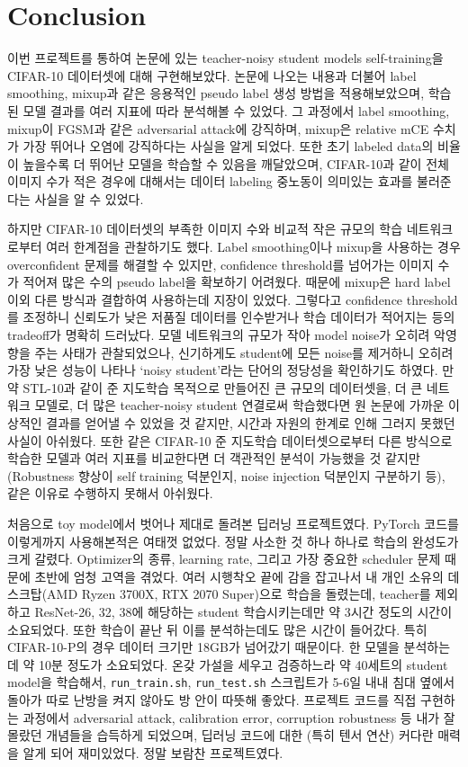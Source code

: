 \section{Conclusion}
이번 프로젝트를 통하여 \cite{xie2020selftraining} 논문에 있는 teacher-noisy student models self-training을 CIFAR-10 데이터셋에 대해 구현해보았다. 논문에 나오는 내용과 더불어 label smoothing, mixup과 같은 응용적인 pseudo label 생성 방법을 적용해보았으며, 학습된 모델 결과를 여러 지표에 따라 분석해볼 수 있었다. 그 과정에서 label smoothing, mixup이 FGSM과 같은 adversarial attack에 강직하며, mixup은 relative mCE 수치가 가장 뛰어나 오염에 강직하다는 사실을 알게 되었다. 또한 초기 labeled data의 비율이 높을수록 더 뛰어난 모델을 학습할 수 있음을 깨달았으며, CIFAR-10과 같이 전체 이미지 수가 적은 경우에 대해서는 데이터 labeling 중노동이 의미있는 효과를 불러준다는 사실을 알 수 있었다.

하지만 CIFAR-10 데이터셋의 부족한 이미지 수와 비교적 작은 규모의 학습 네트워크로부터 여러 한계점을 관찰하기도 했다. Label smoothing이나 mixup을 사용하는 경우 overconfident 문제를 해결할 수 있지만, confidence threshold를 넘어가는 이미지 수가 적어져 많은 수의 pseudo label을 확보하기 어려웠다. 때문에 mixup은 hard label 이외 다른 방식과 결합하여 사용하는데 지장이 있었다. 그렇다고 confidence threshold를 조정하니 신뢰도가 낮은 저품질 데이터를 인수받거나 학습 데이터가 적어지는 등의 tradeoff가 명확히 드러났다. 모델 네트워크의 규모가 작아 model noise가 오히려 악영향을 주는 사태가 관찰되었으나, 신기하게도 student에 모든 noise를 제거하니 오히려 가장 낮은 성능이 나타나 `noisy student'라는 단어의 정당성을 확인하기도 하였다. 만약 STL-10과 같이 준 지도학습 목적으로 만들어진 큰 규모의 데이터셋을, 더 큰 네트워크 모델로, 더 많은 teacher-noisy student 연결로써 학습했다면 원 논문에 가까운 이상적인 결과를 얻어낼 수 있었을 것 같지만, 시간과 자원의 한계로 인해 그러지 못했던 사실이 아쉬웠다. 또한 같은 CIFAR-10 준 지도학습 데이터셋으로부터 다른 방식으로 학습한 모델과 여러 지표를 비교한다면 더 객관적인 분석이 가능했을 것 같지만(Robustness 향상이 self training 덕분인지, noise injection 덕분인지 구분하기 등), 같은 이유로 수행하지 못해서 아쉬웠다.

처음으로 toy model에서 벗어나 제대로 돌려본 딥러닝 프로젝트였다. PyTorch 코드를 이렇게까지 사용해본적은 여태껏 없었다. 정말 사소한 것 하나 하나로 학습의 완성도가 크게 갈렸다. Optimizer의 종류, learning rate, 그리고 가장 중요한 scheduler 문제 때문에 초반에 엄청 고역을 겪었다. 여러 시행착오 끝에 감을 잡고나서 내 개인 소유의 데스크탑(AMD Ryzen 3700X, RTX 2070 Super)으로 학습을 돌렸는데, teacher를 제외하고 ResNet-26, 32, 38에 해당하는 student 학습시키는데만 약 3시간 정도의 시간이 소요되었다. 또한 학습이 끝난 뒤 이를 분석하는데도 많은 시간이 들어갔다. 특히 CIFAR-10-P의 경우 데이터 크기만 18GB가 넘어갔기 때문이다. 한 모델을 분석하는데 약 10분 정도가 소요되었다. 온갖 가설을 세우고 검증하느라 약 40세트의 student model을 학습해서, \texttt{run\_train.sh}, \texttt{run\_test.sh} 스크립트가 5-6일 내내 침대 옆에서 돌아가 따로 난방을 켜지 않아도 방 안이 따뜻해 좋았다. 프로젝트 코드를 직접 구현하는 과정에서 adversarial attack, calibration error, corruption robustness 등 내가 잘 몰랐던 개념들을 습득하게 되었으며, 딥러닝 코드에 대한 (특히 텐서 연산) 커다란 매력을 알게 되어 재미있었다. 정말 보람찬 프로젝트였다.